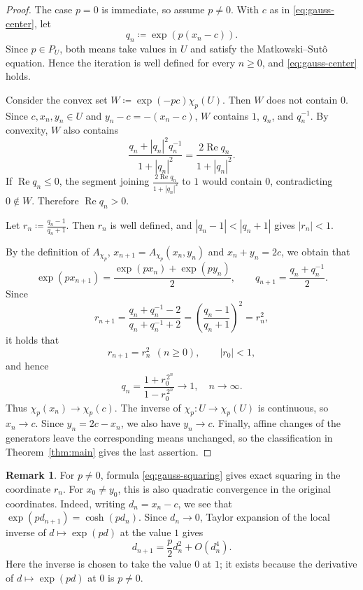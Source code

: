 \documentclass[a4paper, reqno, 11pt]{amsart}
\theoremstyle{definition}
\newtheorem{Rem}[Thm]{Remark}
\begin{document}
\begin{proof}
The case $p=0$ is immediate, so assume $p \ne 0$. 
With $c$ as in \eqref{eq:gauss-center}, let
\begin{equation*}
  q_n\coloneqq \exp(p(x_n-c)).
\end{equation*}
Since $p \in P_U$, both means take values in $U$ and satisfy the Matkowski--Sut\^o equation. 
Hence the iteration is well defined for every $n\ge0$, and \eqref{eq:gauss-center} holds.

Consider the convex set $W\coloneqq \exp(-pc) \chi_p(U)$. 
Then $W$ does not contain $0$. 
Since $c, x_n, y_n \in U$ and $y_n - c = -(x_n - c)$, $W$ contains $1$, $q_n$, and $q_n^{-1}$.
By convexity, $W$ also contains
\[  \frac{q_n+|q_n|^2q_n^{-1}}{1+|q_n|^2} = \frac{2\operatorname{Re}q_n}{1+|q_n|^2}. \]
If $\operatorname{Re}q_n \le 0$, the segment joining $\frac{2\operatorname{Re}q_n}{1+|q_n|^2}$ to $1$ would contain $0$, contradicting $0 \notin W$. 
Therefore $\operatorname{Re}q_n > 0$. 

Let $r_n\coloneqq \frac{q_n-1}{q_n+1}$. 
Then $r_n$ is well defined, and $|q_n-1| < |q_n+1|$ gives $|r_n|<1$.

By the definition of $A_{\chi_p}$, $x_{n+1} = A_{\chi_p} (x_n, y_n)$ and $x_n + y_n = 2c$, 
we obtain that 
\[ \exp(px_{n+1}) = \frac{\exp(p x_n) + \exp(p y_n)}{2},  \qquad  q_{n+1} = \frac{q_n+q_n^{-1}}2. \]
Since 
\[  r_{n+1}  =\frac{q_n+q_n^{-1}-2}{q_n+q_n^{-1}+2}  =\left(\frac{q_n-1}{q_n+1}\right)^2 =r_n^2, \]
it holds that  
\begin{equation}\label{eq:gauss-squaring}
  r_{n+1} = r_n^2 \ \ (n \ge 0), \qquad |r_0|<1,
\end{equation}
and hence
\[ q_n=\frac{1+r_0^{\,2^n}}{1-r_0^{\,2^n}} \longrightarrow1, \quad n \to \infty. \]
Thus $\chi_p(x_n)\to\chi_p(c)$. 
The inverse of $\chi_p:U\to\chi_p(U)$ is continuous, so $x_n\to c$.
Since $y_n = 2c - x_n$, we also have $y_n\to c$.
Finally, affine changes of the generators leave the corresponding means unchanged, so the classification in Theorem~\ref{thm:main} gives the last assertion.
\end{proof}

\begin{Rem}\label{rem:gauss-quadratic}
For $p\neq0$, formula \eqref{eq:gauss-squaring} gives exact squaring in the coordinate $r_n$. 
For $x_0\neq y_0$, this is also quadratic convergence
in the original coordinates. Indeed, writing $d_n = x_n-c$, we see that $\exp(pd_{n+1}) = \cosh(pd_n)$. 
Since $d_n\to0$, Taylor expansion of the local inverse of
$d \mapsto \exp(pd)$ at the value $1$ gives
\begin{equation*}
  d_{n+1} = \frac{p}{2} d_n^2 + O(d_n^4).
\end{equation*}
Here the inverse is chosen to take the value $0$ at $1$; it exists because
the derivative of $d\mapsto \exp(pd)$ at $0$ is $p\neq0$.
\end{Rem}
\end{document}
